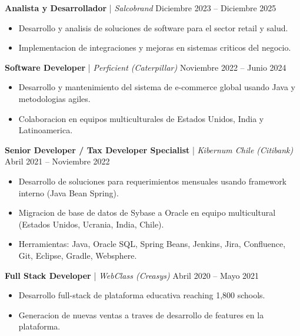 \documentclass[11pt,a4paper]{article}
\begin{document}
\vspace{8pt}

\textbf{Analista y Desarrollador} | \textit{Salcobrand} \hfill Diciembre 2023 -- Diciembre 2025 \\
\begin{itemize}[noitemsep, topsep=0pt]
    \item Desarrollo y analisis de soluciones de software para el sector retail y salud.
    \item Implementacion de integraciones y mejoras en sistemas criticos del negocio.
\end{itemize}

\vspace{8pt}

\textbf{Software Developer} | \textit{Perficient (Caterpillar)} \hfill Noviembre 2022 -- Junio 2024 \\
\begin{itemize}[noitemsep, topsep=0pt]
    \item Desarrollo y mantenimiento del sistema de e-commerce global usando Java y metodologias agiles.
    \item Colaboracion en equipos multiculturales de Estados Unidos, India y Latinoamerica.
\end{itemize}

\vspace{8pt}

\textbf{Senior Developer / Tax Developer Specialist} | \textit{Kibernum Chile (Citibank)} \hfill Abril 2021 -- Noviembre 2022 \\
\begin{itemize}[noitemsep, topsep=0pt]
    \item Desarrollo de soluciones para requerimientos mensuales usando framework interno (Java Bean Spring).
    \item Migracion de base de datos de Sybase a Oracle en equipo multicultural (Estados Unidos, Ucrania, India, Chile).
    \item Herramientas: Java, Oracle SQL, Spring Beans, Jenkins, Jira, Confluence, Git, Eclipse, Gradle, Websphere.
\end{itemize}

\vspace{8pt}

\textbf{Full Stack Developer} | \textit{WebClass (Creasys)} \hfill Abril 2020 -- Mayo 2021 \\
\begin{itemize}[noitemsep, topsep=0pt]
    \item Desarrollo full-stack de plataforma educativa reaching 1,800 schools.
    \item Generacion de nuevas ventas a traves de desarrollo de features en la plataforma.
\end{itemize}
\end{document}
